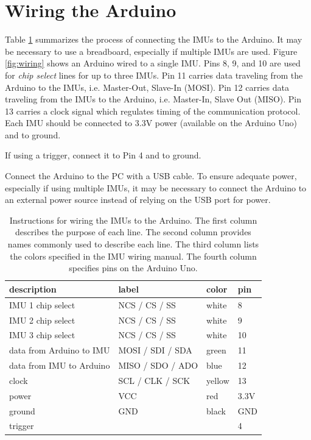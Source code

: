 \documentclass[11pt,letterpaper,article,oneside]{memoir}
\begin{document}
\section{Wiring the Arduino}
\label{sec:wiring}
Table \ref{tab:wiring} summarizes the process of connecting the IMUs to the
Arduino.  It may be necessary to use a breadboard, especially if multiple IMUs
are used.  Figure \ref{fig:wiring} shows an Arduino wired to a single IMU.  Pins
8, 9, and 10 are used for \emph{chip select} lines for up to three IMUs. Pin 11
carries data traveling from the Arduino to the IMUs, i.e. Master-Out, Slave-In
(MOSI).  Pin 12 carries data traveling from the IMUs to the Arduino, i.e.
Master-In, Slave Out (MISO). Pin 13 carries a clock signal which regulates
timing of the communication protocol.  Each IMU should be connected to 3.3V
power (available on the Arduino Uno) and to ground.

If using a trigger, connect it to Pin 4 and to ground.

Connect the Arduino to the PC with a USB cable.  To ensure adequate power,
especially if using multiple IMUs, it may be necessary to connect the Arduino to
an external power source instead of relying on the USB port for power.

\begin{table}
\centering
\begin{tabular}{@{}*4l@{}}
\toprule
description & label & color & pin \\
\midrule 
IMU 1 chip select & NCS / CS / SS & white & 8 \\
IMU 2 chip select & NCS / CS / SS & white & 9 \\
IMU 3 chip select & NCS / CS / SS & white & 10 \\
data from Arduino to IMU & MOSI / SDI / SDA & green & 11 \\
data from IMU to Arduino & MISO / SDO / ADO & blue & 12 \\
clock & SCL / CLK / SCK & yellow & 13 \\
power & VCC & red & 3.3V \\
ground & GND & black & GND \\
trigger &  &  & 4 \\
\bottomrule
\end{tabular}

\caption{Instructions for wiring the IMUs to the Arduino. The first column
describes the purpose of each line. The second column provides names commonly
used to describe each line. The third column lists the colors specified in the
IMU wiring manual. The fourth column specifies pins on the Arduino
Uno.}

\label{tab:wiring}
\end{table}
\end{document}
